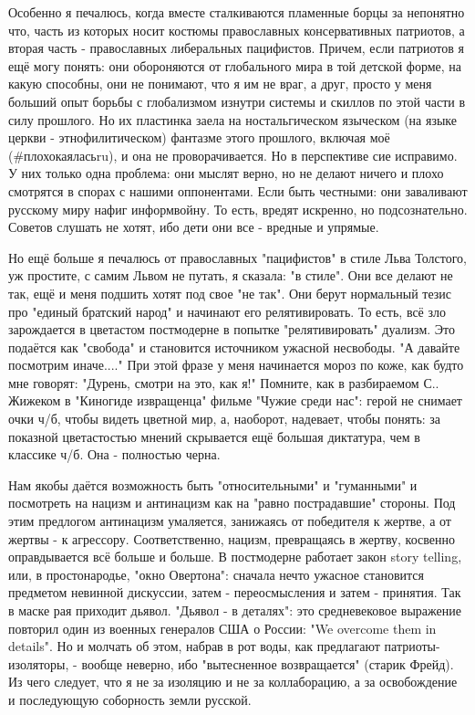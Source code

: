 Особенно я печалюсь, когда вместе сталкиваются пламенные борцы за непонятно
что, часть из которых носит костюмы православных консервативных патриотов, а
вторая часть - православных либеральных пацифистов. Причем, если патриотов я
ещё могу понять: они обороняются от глобального мира в той детской форме, на
какую способны, они не понимают, что я им не враг, а друг, просто у меня
больший опыт борьбы с глобализмом изнутри системы и скиллов по этой части в
силу прошлого. Но их пластинка заела на ностальгическом языческом (на языке
церкви - этнофилитическом) фантазме этого прошлого, включая моё
(\#плохокаяласьru), и она не проворачивается. Но в перспективе сие исправимо. У
них только одна проблема: они мыслят верно, но не делают ничего и плохо
смотрятся в спорах с нашими оппонентами. Если быть честными: они заваливают
русскому миру нафиг информвойну.  То есть, вредят искренно, но подсознательно.
Советов слушать не хотят, ибо дети они все - вредные и упрямые.

Но ещё больше я печалюсь от православных "пацифистов" в стиле Льва Толстого, уж
простите, с самим Львом не путать, я сказала: "в стиле". Они все делают не так,
ещё и меня подшить хотят под свое "не так". Они берут нормальный тезис про
"единый братский народ" и начинают его релятивировать. То есть, всё зло
зарождается в цветастом постмодерне в попытке "релятивировать" дуализм. Это
подаётся как "свобода" и становится источником ужасной несвободы. "А давайте
посмотрим иначе...." При этой фразе у меня начинается мороз по коже, как будто
мне говорят: "Дурень, смотри на это, как я!"  Помните, как в разбираемом С..
Жижеком в "Киногиде извращенца" фильме "Чужие среди нас": герой не снимает
очки ч/б, чтобы видеть цветной мир, а, наоборот, надевает, чтобы понять: за
показной цветастостью  мнений скрывается ещё большая диктатура, чем в классике
ч/б. Она - полностью черна. 

Нам якобы даётся возможность быть "относительными" и "гуманными" и посмотреть
на нацизм и антинацизм как на "равно пострадавшие" стороны. Под этим предлогом
антинацизм умаляется, занижаясь от победителя к жертве, а от жертвы - к
агрессору. Соответственно, нацизм, превращаясь в жертву, косвенно оправдывается
всё больше и больше. В постмодерне работает закон story telling, или, в
простонародье, "окно Овертона": сначала нечто ужасное становится предметом
невинной дискуссии, затем - переосмысления и затем - принятия. Так в маске рая
приходит дьявол. "Дьявол - в деталях": это средневековое выражение повторил
один из военных генералов США о России: "We overcome them in details". Но и
молчать об этом, набрав в рот воды, как предлагают патриоты-изоляторы, - вообще
неверно, ибо "вытесненное возвращается" (старик Фрейд). Из чего следует, что я
не за изоляцию и не за коллаборацию, а за освобождение и последующую соборность
земли русской.

